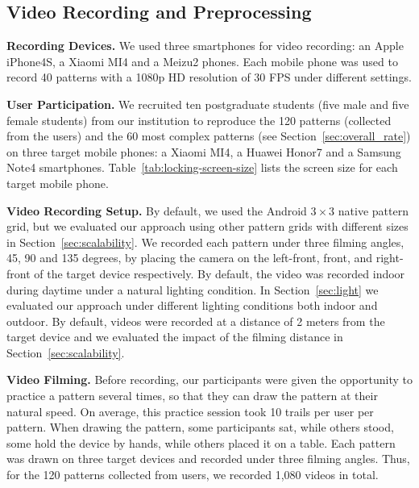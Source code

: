     \subsection{Video Recording and Preprocessing}
    \noindent\textbf{Recording Devices.} We used three smartphones for video recording: an Apple iPhone4S,
     a Xiaomi MI4 and a Meizu2 phones. Each mobile phone was used to record 40 patterns with a
    1080p HD resolution of 30 FPS under different settings.

    \vspace{2mm}
    \noindent\textbf{User Participation.} We recruited ten postgraduate students (five male and five female
    students) from our institution to reproduce the 120 patterns (collected from the users)
    and the 60 most complex patterns (see Section~\ref{sec:overall_rate})  on three target mobile phones:
    a Xiaomi MI4, a Huawei Honor7 and a Samsung Note4 smartphones. Table~\ref{tab:locking-screen-size} lists
    the screen size for each target mobile phone.

    \vspace{2mm}
   \noindent\textbf{Video Recording Setup.}
    By default, we used the  Android $3 \times 3$ native pattern grid,
    but we evaluated our approach using other pattern grids with different sizes in
    Section~\ref{sec:scalability}. We recorded each pattern under three filming
    angles, 45, 90 and 135 degrees, by placing the camera on the left-front, front, and right-front
    of the target device respectively.
    By default, the video
    was recorded indoor during daytime under a natural lighting condition. In
    Section~\ref{sec:light} we evaluated our approach under different lighting conditions
    both indoor and outdoor. By default, videos were recorded at a distance of
    2 meters from the target device and we evaluated the impact of the filming distance in
    Section~\ref{sec:scalability}.

    \vspace{2mm}
    \noindent \textbf{Video Filming.}
     Before recording, our participants were given the opportunity to practice a pattern
    several times, so that they can draw the pattern at
    their natural speed. On average, this practice session took 10 trails per user per pattern.
    When drawing the
    pattern, some participants sat, while others stood, some hold the device
    by hands, while others placed it on a table.
    Each pattern was drawn on three target devices and
    recorded under three filming angles. Thus, for the 120 patterns collected from users, we recorded 1,080 videos in total.

